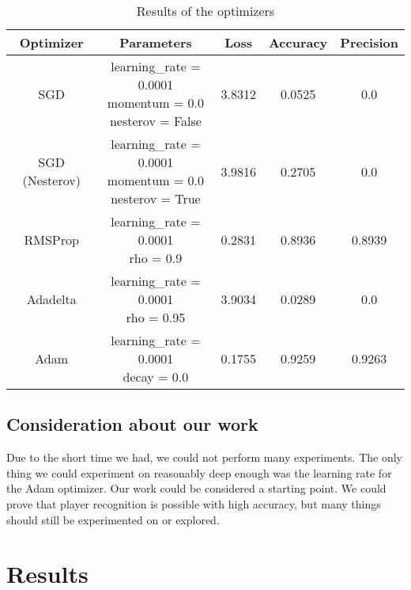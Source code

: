 		\begin{table}[h]
			
			\caption{\label{tab:opt}Results of the optimizers}
			
			\centering
			\begin{tabular}{|c|c|c|c|c|}
		
				\hline
				\textbf{Optimizer} & \textbf{Parameters} & \textbf{Loss} & \textbf{Accuracy} & \textbf{Precision} \\
				\hline
				SGD & \makecell{learning\_rate = 0.0001 \\ momentum = 0.0 \\ nesterov = False}  & 3.8312 & 0.0525 & 0.0 \\
				\hline
				SGD (Nesterov) & \makecell{learning\_rate = 0.0001 \\ momentum = 0.0 \\ nesterov = True} & 3.9816 & 0.2705 & 0.0\\
				\hline
				RMSProp & \makecell{learning\_rate = 0.0001 \\ rho = 0.9} & 0.2831 & 0.8936 & 0.8939\\
				\hline
				Adadelta & \makecell{learning\_rate = 0.0001 \\ rho = 0.95} & 3.9034 & 0.0289 & 0.0 \\
				\hline
				Adam & \makecell{learning\_rate = 0.0001 \\ decay = 0.0} & 0.1755 & 0.9259 & 0.9263 \\
				\hline
			
			\end{tabular}
	
		\end{table}
		
	\subsection{Consideration about our work}
	
		Due to the short time we had, we could not perform many experiments. 
		The only thing we could experiment on reasonably deep enough was the learning rate for the Adam optimizer. 
		Our work could be considered a starting point. 
		We could prove that player recognition is possible with high accuracy, but many things should still be experimented on or explored.

\section{Results}

